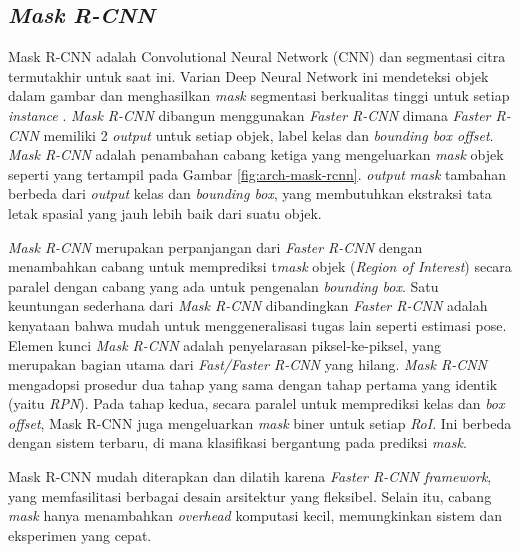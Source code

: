\subsection{\textit{Mask R-CNN}}
\label{subsec:mask-rcnn}

Mask R-CNN adalah Convolutional Neural Network (CNN) dan segmentasi citra termutakhir untuk saat ini. Varian Deep Neural Network ini mendeteksi objek dalam gambar dan menghasilkan \textit{mask} segmentasi berkualitas tinggi untuk setiap \textit{instance} \citep{mask-rcnn}. \textit{Mask R-CNN} dibangun menggunakan\textit{ Faster R-CNN} dimana \textit{Faster R-CNN} memiliki 2 \textit{output} untuk setiap objek, label kelas dan \textit{bounding box offset}. \textit{Mask R-CNN} adalah penambahan cabang ketiga yang mengeluarkan \textit{mask} objek seperti yang tertampil pada Gambar \ref{fig:arch-mask-rcnn}. \textit{output} \textit{mask} tambahan berbeda dari \textit{output} kelas dan \textit{bounding box}, yang membutuhkan ekstraksi tata letak spasial yang jauh lebih baik dari suatu objek.

\textit{Mask R-CNN} merupakan perpanjangan dari \textit{Faster R-CNN} dengan menambahkan cabang untuk memprediksi t\textit{mask} objek (\textit{Region of Interest}) secara paralel dengan cabang yang ada untuk pengenalan \textit{bounding box}. Satu keuntungan sederhana dari \textit{Mask R-CNN} dibandingkan \textit{Faster R-CNN} adalah kenyataan bahwa mudah untuk menggeneralisasi tugas lain seperti estimasi pose. Elemen kunci \textit{Mask R-CNN} adalah penyelarasan piksel-ke-piksel, yang merupakan bagian utama dari \textit{Fast/Faster R-CNN} yang hilang. \textit{Mask R-CNN} mengadopsi prosedur dua tahap yang sama dengan tahap pertama yang identik (yaitu \textit{RPN}). Pada tahap kedua, secara paralel untuk memprediksi kelas dan \textit{box offset}, Mask R-CNN juga mengeluarkan \textit{mask} biner untuk setiap \textit{RoI}. Ini berbeda dengan sistem terbaru, di mana klasifikasi bergantung pada prediksi \textit{mask}.

Mask R-CNN mudah diterapkan dan dilatih karena \textit{Faster R-CNN framework}, yang memfasilitasi berbagai desain arsitektur yang fleksibel. Selain itu, cabang \textit{mask} hanya menambahkan \textit{overhead} komputasi kecil, memungkinkan sistem dan eksperimen yang cepat.

